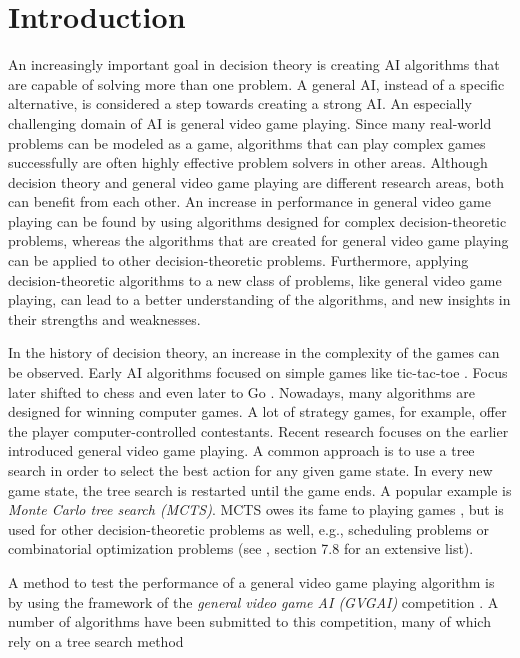 \chapter{Introduction}
\label{sec:introduction}

An increasingly important goal in decision theory is creating AI algorithms that
are capable of solving more than one problem. A general AI, instead of a
specific alternative, is considered a step towards creating a strong AI.  An
especially challenging domain of AI is general video game playing.  Since many
real-world problems can be modeled as a game, algorithms that can play complex
games successfully are often highly effective problem solvers in other areas.
Although decision theory and general video game playing are different research
areas, both can benefit from each other.  An increase in performance in general
video game playing can be found by using algorithms designed for complex
decision-theoretic problems, whereas the algorithms that are created for general
video game playing can be applied to other decision-theoretic problems.
Furthermore, applying decision-theoretic algorithms to a new class of problems,
like general video game playing, can lead to a better understanding of the
algorithms, and new insights in their strengths and weaknesses. 

In the history of decision theory, an increase in the complexity of the games
can be observed. Early AI algorithms focused on simple games like tic-tac-toe
\cite{michie1968boxes}.  Focus later shifted to chess and even later to Go
\cite{sutton1998reinforcement, brugmann1993monte}.  Nowadays, many algorithms
are designed for winning computer games. A lot of strategy games, for example,
offer the player computer-controlled contestants.  Recent research focuses on
the earlier introduced general video game playing.  A common approach is to use
a tree search in order to select the best action for any given game state. In
every new game state, the tree search is restarted until the game ends.  A
popular example is \emph{Monte Carlo tree search (MCTS)}.  MCTS owes its fame to
playing games \cite{gelly2006modification}, but is used for other
decision-theoretic problems as well, e.g., scheduling problems or combinatorial
optimization problems (see \cite{browne2012survey}, section 7.8 for an
extensive list). 

A method to test the performance of a general video game playing algorithm is
by using the framework of the \emph{general video game AI (GVGAI)} competition
\cite{perez2014}.  A number of algorithms have been submitted to this
competition, many of which rely on a tree search method \cite{perez2015open,
ross2014general, agent2015torsten}

